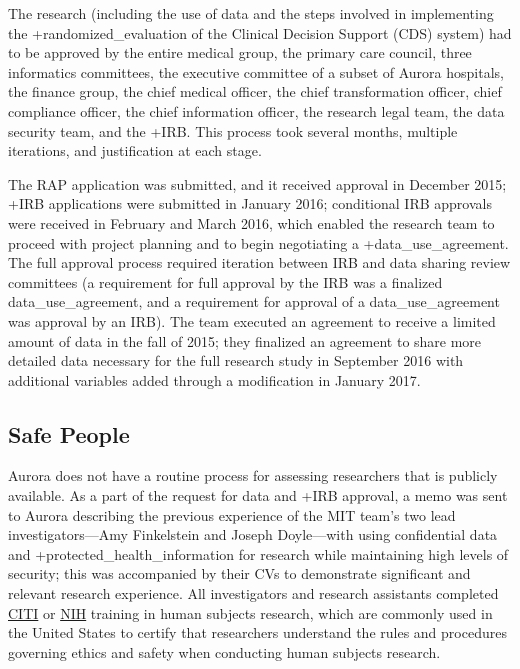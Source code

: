 \documentclass[
]{book}
\begin{document}
The research (including the use of data and the steps involved in implementing the +randomized\_evaluation\textbar{} of the Clinical Decision Support (CDS) system) had to be approved by the entire medical group, the primary care council, three informatics committees, the executive committee of a subset of Aurora hospitals, the finance group, the chief medical officer, the chief transformation officer, chief compliance officer, the chief information officer, the research legal team, the data security team, and the +IRB\textbar. This process took several months, multiple iterations, and justification at each stage.

The RAP application was submitted, and it received approval in December 2015; +IRB\textbar{} applications were submitted in January 2016; conditional IRB approvals were received in February and March 2016, which enabled the research team to proceed with project planning and to begin negotiating a +data\_use\_agreement\textbar. The full approval process required iteration between IRB and data sharing review committees (a requirement for full approval by the IRB was a finalized data\_use\_agreement, and a requirement for approval of a data\_use\_agreement was approval by an IRB). The team executed an agreement to receive a limited amount of data in the fall of 2015; they finalized an agreement to share more detailed data necessary for the full research study in September 2016 with additional variables added through a modification in January 2017.

\hypertarget{safe-people-4}{%
\subsection{Safe People}\label{safe-people-4}}

Aurora does not have a routine process for assessing researchers that is publicly available. As a part of the request for data and +IRB\textbar{} approval, a memo was sent to Aurora describing the previous experience of the MIT team's two lead investigators---Amy Finkelstein and Joseph Doyle---with using confidential data and +protected\_health\_information\textbar{} for research while maintaining high levels of security; this was accompanied by their CVs to demonstrate significant and relevant research experience. All investigators and research assistants completed \href{https://about.citiprogram.org/en/homepage/}{CITI} or \href{https://nexus.od.nih.gov/all/2018/09/07/protecting-human-research-participants-phrp-online-tutorial-no-longer-available-as-of-september-26-2018/}{NIH} training in human subjects research, which are commonly used in the United States to certify that researchers understand the rules and procedures governing ethics and safety when conducting human subjects research.
\end{document}
